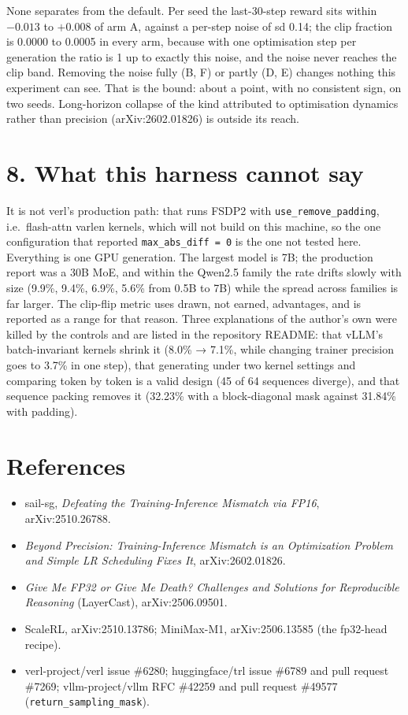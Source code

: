 \documentclass[
  10pt,
]{article}
\providecommand{\tightlist}{%
  \setlength{\itemsep}{0pt}\setlength{\parskip}{0pt}}
\begin{document}
None separates from the default. Per seed the last-30-step reward sits
within \(-0.013\) to \(+0.008\) of arm A, against a per-step noise of sd
0.14; the clip fraction is 0.0000 to 0.0005 in every arm, because with
one optimisation step per generation the ratio is 1 up to exactly this
noise, and the noise never reaches the clip band. Removing the noise
fully (B, F) or partly (D, E) changes nothing this experiment can see.
That is the bound: about a point, with no consistent sign, on two seeds.
Long-horizon collapse of the kind attributed to optimisation dynamics
rather than precision (arXiv:2602.01826) is outside its reach.

\hypertarget{what-this-harness-cannot-say}{%
\section{8. What this harness cannot
say}\label{what-this-harness-cannot-say}}

It is not verl's production path: that runs FSDP2 with
\texttt{use\_remove\_padding}, i.e.~flash-attn varlen kernels, which
will not build on this machine, so the one configuration that reported
\texttt{max\_abs\_diff\ =\ 0} is the one not tested here. Everything is
one GPU generation. The largest model is 7B; the production report was a
30B MoE, and within the Qwen2.5 family the rate drifts slowly with size
(9.9\%, 9.4\%, 6.9\%, 5.6\% from 0.5B to 7B) while the spread across
families is far larger. The clip-flip metric uses drawn, not earned,
advantages, and is reported as a range for that reason. Three
explanations of the author's own were killed by the controls and are
listed in the repository README: that vLLM's batch-invariant kernels
shrink it (8.0\% → 7.1\%, while changing trainer precision goes to 3.7\%
in one step), that generating under two kernel settings and comparing
token by token is a valid design (45 of 64 sequences diverge), and that
sequence packing removes it (32.23\% with a block-diagonal mask against
31.84\% with padding).

\hypertarget{references}{%
\section{References}\label{references}}

\begin{itemize}
\tightlist
\item
  sail-sg, \emph{Defeating the Training-Inference Mismatch via FP16},
  arXiv:2510.26788.
\item
  \emph{Beyond Precision: Training-Inference Mismatch is an Optimization
  Problem and Simple LR Scheduling Fixes It}, arXiv:2602.01826.
\item
  \emph{Give Me FP32 or Give Me Death? Challenges and Solutions for
  Reproducible Reasoning} (LayerCast), arXiv:2506.09501.
\item
  ScaleRL, arXiv:2510.13786; MiniMax-M1, arXiv:2506.13585 (the fp32-head
  recipe).
\item
  verl-project/verl issue \#6280; huggingface/trl issue \#6789 and pull
  request \#7269; vllm-project/vllm RFC \#42259 and pull request \#49577
  (\texttt{return\_sampling\_mask}).
\end{itemize}
\end{document}
